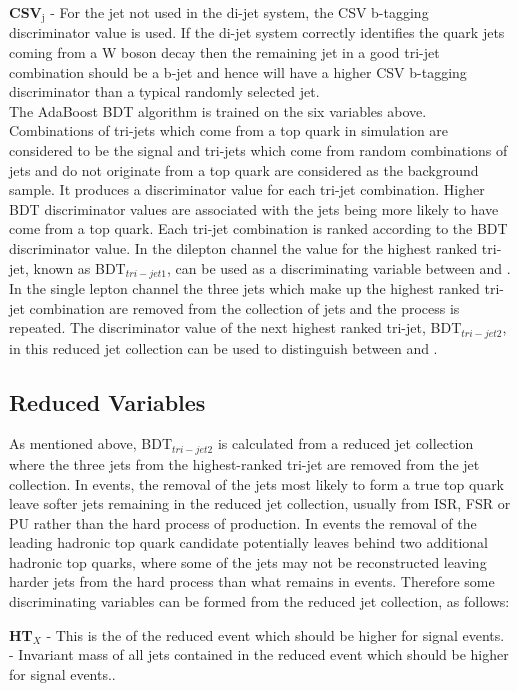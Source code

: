 \textbf{CSV}$_{\textrm{j}}$ - For the jet not used in the di-jet system, the CSV b-tagging discriminator value is used. If the di-jet system correctly identifies the quark jets coming from a W boson decay then the remaining jet in a good tri-jet combination should be a b-jet and hence will have a higher CSV b-tagging discriminator than a typical randomly selected jet.\\
The AdaBoost BDT algorithm is trained on the six variables above. Combinations of tri-jets which come from a top quark in simulation are considered to be the signal and tri-jets which come from random combinations of jets and do not originate from a top quark are considered as the background sample. It produces a discriminator value for each tri-jet combination. Higher BDT discriminator values are associated with the jets being more likely to have come from a top quark. Each tri-jet combination is ranked according to the BDT discriminator value. In the dilepton channel the value for the highest ranked tri-jet, known as BDT$_{tri-jet1}$, can be used as a discriminating variable between \tttt and \ttbar. In the single lepton channel the three jets which make up the highest ranked tri-jet combination are removed from the collection of jets and the process is repeated. The discriminator value of the next highest ranked tri-jet, BDT$_{tri-jet2}$, in this reduced jet collection can be used to distinguish between \tttt and \ttbar.

\subsection{Reduced Variables}
As mentioned above, BDT$_{tri-jet2}$ is calculated from a reduced jet collection where the three jets from the highest-ranked tri-jet are removed from the jet collection. In \ttbar events, the removal of the jets most likely to form a true top quark leave softer jets remaining in the reduced jet collection, usually from ISR, FSR or PU rather than the hard process of \ttbar production. In \tttt events the removal of the leading hadronic top quark candidate potentially leaves behind two additional hadronic top quarks, where some of the jets may not be reconstructed leaving harder jets from the hard process than what remains in \ttbar events. Therefore some discriminating variables can be formed from the reduced jet collection, as follows:

\textbf{HT$_{X}$} - This is the \HT of the reduced event which should be higher for signal \tttt events.\\
\textbf{\sumjetmassX} - Invariant mass of all jets contained in the reduced event which should be higher for signal \tttt events..

